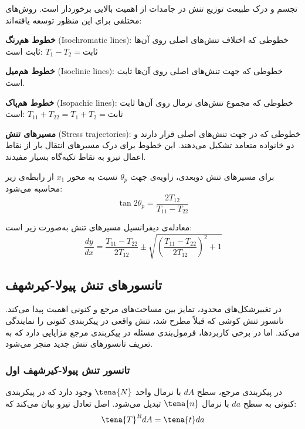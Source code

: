 تجسم و درک طبیعت توزیع تنش در جامدات از اهمیت بالایی برخوردار است. روش‌های مختلفی برای این منظور توسعه یافته‌اند:

\textbf{خطوط هم‌رنگ} (Isochromatic lines): خطوطی که اختلاف تنش‌های اصلی روی آن‌ها ثابت است: $T_1 - T_2 = \text{ثابت}$

\textbf{خطوط هم‌میل} (Isoclinic lines): خطوطی که جهت تنش‌های اصلی روی آن‌ها ثابت است.

\textbf{خطوط هم‌پاک} (Isopachic lines): خطوطی که مجموع تنش‌های نرمال روی آن‌ها ثابت است: $T_{11} + T_{22} = T_1 + T_2 = \text{ثابت}$

\textbf{مسیرهای تنش} (Stress trajectories): خطوطی که در جهت تنش‌های اصلی قرار دارند و دو خانواده متعامد تشکیل می‌دهند. این خطوط برای درک مسیرهای انتقال بار از نقاط اعمال نیرو به نقاط تکیه‌گاه بسیار مفیدند.

برای مسیرهای تنش دوبعدی، زاویه‌ی جهت $\theta_p$ نسبت به محور $x_1$ از رابطه‌ی زیر محاسبه می‌شود:
\begin{equation}
	\tan 2\theta_p = \frac{2T_{12}}{T_{11} - T_{22}}
\end{equation}

معادله‌ی دیفرانسیل مسیرهای تنش به‌صورت زیر است:
\begin{equation}
	\frac{dy}{dx} = \frac{T_{11} - T_{22}}{2T_{12}} \pm \sqrt{\left(\frac{T_{11} - T_{22}}{2T_{12}}\right)^2 + 1}
\end{equation}

\subsection{تانسورهای تنش پیولا-کیرشهف}

در تغییرشکل‌های محدود، تمایز بین مساحت‌های مرجع و کنونی اهمیت پیدا می‌کند. تانسور تنش کوشی که قبلاً مطرح شد، تنش واقعی در پیکربندی کنونی را نمایندگی می‌کند. اما در برخی کاربردها، فرمول‌بندی مسئله در پیکربندی مرجع مزایایی دارد که به تعریف تانسورهای تنش جدید منجر می‌شود.

\subsubsection{تانسور تنش پیولا-کیرشهف اول}

در پیکربندی مرجع، سطح $dA$ با نرمال واحد $\tena{N}$ وجود دارد که در پیکربندی کنونی به سطح $da$ با نرمال $\tena{n}$ تبدیل می‌شود. اصل تعادل نیرو بیان می‌کند که:
\begin{equation}
	\tena{T}^R dA = \tena{t} da
\end{equation}


